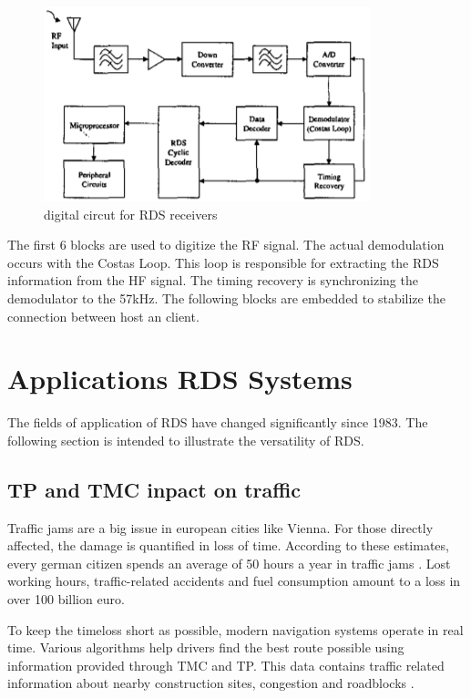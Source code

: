 \documentclass[conference,12pt,a4paper]{IEEEtran}
\begin{document}
	\begin{figure}[h]
		\centering
		\includegraphics[width = \linewidth]{img/circut}
		\caption{digital circut for RDS receivers}
		\label{fig: receiverCircut}
	\end{figure}

	The first 6 blocks are used to digitize the RF signal. The actual demodulation occurs with the Costas Loop. This loop is responsible for extracting the RDS information from the HF signal. The timing recovery is synchronizing the demodulator to the 57kHz. The following blocks are embedded to stabilize the connection between host an client.\\    
	
	
	\section{Applications RDS Systems}

	The fields of application of RDS have changed significantly since 1983. The following section is intended to illustrate the versatility of RDS.
	
	\subsection{TP and TMC inpact on traffic}
	
	Traffic jams are a big issue in european cities like Vienna. For those directly affected, the damage is quantified in loss of time. According to these estimates, every german citizen spends an average of 50 hours a year in traffic jams \cite{Stau}. Lost working hours, traffic-related accidents and fuel consumption amount to a loss in over 100 billion euro. 
	
	To keep the timeloss short as possible, modern navigation systems operate in real time. 
	Various algorithms help drivers find the best route possible using information provided through TMC and TP. This data contains traffic related information about nearby construction sites, congestion and roadblocks \cite{uyeki2010route}.
	
\end{document}
